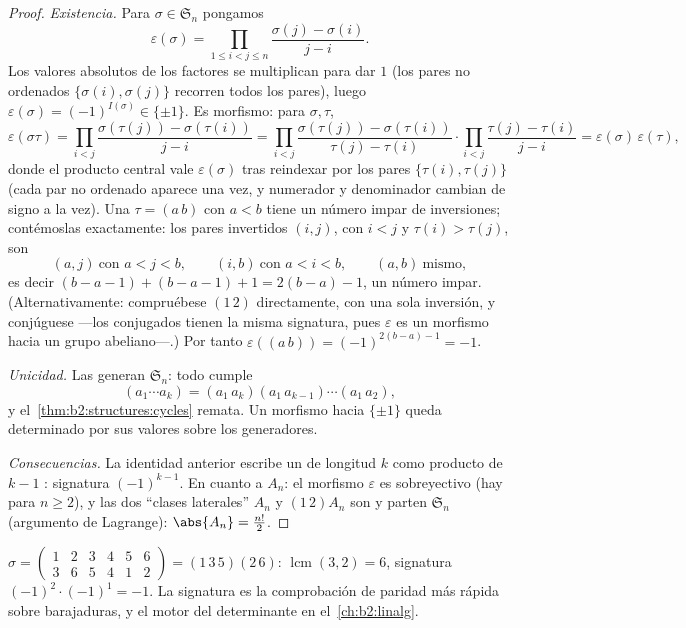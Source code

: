 \begin{proof}
\emph{Existencia.} Para $\sigma \in \mathfrak{S}_n$ pongamos
\[
\varepsilon(\sigma)
= \prod_{1 \leq i < j \leq n}
\frac{\sigma(j) - \sigma(i)}{j - i} .
\]
Los valores absolutos de los factores se multiplican para dar $1$
(los pares no ordenados $\{\sigma(i), \sigma(j)\}$ recorren todos los
pares), luego $\varepsilon(\sigma) = (-1)^{I(\sigma)} \in \{\pm1\}$.
Es morfismo: para $\sigma, \tau$,
\[
\varepsilon(\sigma\tau)
= \prod_{i<j} \frac{\sigma(\tau(j)) - \sigma(\tau(i))}{j - i}
= \prod_{i<j} \frac{\sigma(\tau(j)) - \sigma(\tau(i))}{\tau(j) -
\tau(i)} \cdot \prod_{i<j} \frac{\tau(j) - \tau(i)}{j - i}
= \varepsilon(\sigma)\,\varepsilon(\tau),
\]
donde el producto central vale $\varepsilon(\sigma)$ tras
reindexar por los pares $\{\tau(i), \tau(j)\}$ (cada par no
ordenado aparece una vez, y numerador y denominador cambian de
signo a la vez). Una  $\tau = (a\,b)$ con $a < b$
tiene un número impar de inversiones; contémoslas exactamente:
los pares invertidos $(i, j)$, con $i < j$ y $\tau(i) > \tau(j)$,
son
\[
(a, j) \ \text{con } a < j < b, \qquad
(i, b) \ \text{con } a < i < b, \qquad
(a, b) \ \text{mismo},
\]
es decir $(b - a - 1) + (b - a - 1) + 1 = 2(b - a) - 1$, un
número impar. (Alternativamente: compruébese $(1\,2)$
directamente, con una sola inversión, y conjúguese ---los
conjugados tienen la misma signatura, pues $\varepsilon$ es un
morfismo hacia un grupo abeliano---.) Por tanto
$\varepsilon((a\,b)) = (-1)^{2(b-a)-1} = -1$.

\emph{Unicidad.} Las  generan
$\mathfrak{S}_n$: todo  cumple
\[
(a_1\cdots a_k) = (a_1\,a_k)(a_1\,a_{k-1})\cdots(a_1\,a_2),
\]
y el~\cref{thm:b2:structures:cycles} remata. Un morfismo hacia
$\{\pm1\}$ queda determinado por sus valores sobre los generadores.

\emph{Consecuencias.} La identidad anterior escribe un  de
longitud $k$ como producto de $k - 1$ : signatura
$(-1)^{k-1}$. En cuanto a $A_n$: el morfismo $\varepsilon$ es
sobreyectivo (hay  para $n \geq 2$), y las dos
``clases laterales'' $A_n$ y $(1\,2)A_n$ son  y parten
$\mathfrak{S}_n$ (argumento de Lagrange): $\abs{A_n} =
\frac{n!}{2}$.
\end{proof}

\begin{example}\label{ex:b2:structures:snexample}
$\sigma = \begin{pmatrix} 1&2&3&4&5&6\\ 3&6&5&4&1&2 \end{pmatrix}
= (1\,3\,5)(2\,6)$:  $\operatorname{lcm}(3,2) = 6$, signatura
$(-1)^{2}\cdot(-1)^{1} = -1$. La signatura es la comprobación de
paridad más rápida sobre barajaduras, y el motor del determinante
en el~\cref{ch:b2:linalg}.
\end{example}

